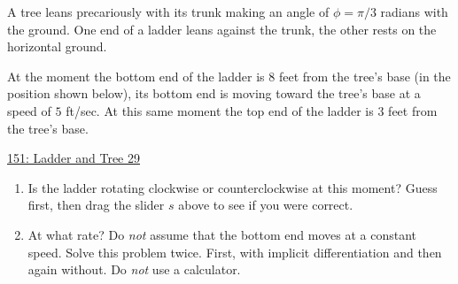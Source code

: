 \documentclass{ximera}
\begin{document}
\begin{question}  \label{Qvgggbbhhhggg}
A tree leans precariously with its trunk making an angle of $\phi = \pi/3$ radians with the ground. One end of a ladder leans against the trunk, the other rests on the horizontal ground.

At the moment the bottom end of the ladder is $8$ feet from the tree's base (in the position shown below), its bottom end is moving toward the tree's base at a speed of $5$ ft/sec. At this same moment the top end of the ladder is $3$ feet from the tree's base.

 
\begin{onlineOnly}
   \begin{center}
\end{center}
\end{onlineOnly}

\href{https://www.desmos.com/calculator/xrgftlr9dx}{151: Ladder and Tree 29}

\begin{enumerate}
\item Is the ladder rotating clockwise or counterclockwise at this moment? Guess first, then drag the slider $s$ above to see if you were correct.

\item At what rate? Do \emph{not} assume that the bottom end moves at a constant speed. Solve this problem twice. First, with implicit differentiation and then again without. Do \emph{not} use a calculator. 
\end{enumerate}


\end{question}
\end{document}
